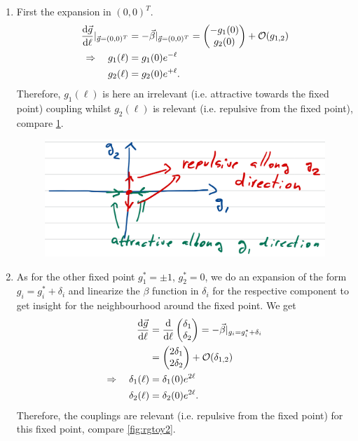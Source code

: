 \begin{enumerate} 
	\item  First the expansion in $(0,0)^T$.
\begin{align}
	\frac{\mathrm{d} \vec{g}}{\mathrm{d} \ell }|_{\vec{g}=(0,0)^T} &= - \vec{\beta}|_{\vec{g}=(0,0)^T} = \begin{pmatrix}
		-g_1(0)\\
		g_2(0) \\
	\end{pmatrix} + \mathcal{O}(g_{1,2}) \nonumber \\
\Rightarrow \quad g_1(\ell) &= g_1(0) e^{-\ell} \\
g_2(\ell) &= g_2(0) e^{+ \ell}.
\end{align}
Therefore, $g_1(\ell)$ is here an irrelevant (i.e. attractive towards the fixed point) coupling whilst $g_2(\ell)$ is relevant (i.e. repulsive from the fixed point), compare \ref{fig:rgtoy1}. 
\begin{figure}[h!]
	\centering
	\includegraphics[width=0.7\linewidth]{gfx/RGtoy1}
	\caption{}
	\label{fig:rgtoy1}
\end{figure}
\item As for the other fixed point $g^*_1=\pm1$, $g^*_2=0$, we do an expansion of the form $g_i=g^*_i+\delta_i$ and linearize the $\beta$ function in $\delta_i$ for the respective component to get insight for the neighbourhood around the fixed point. We get
\begin{align}
	\frac{\mathrm{d} \vec{g}}{\mathrm{d} \ell} &= \frac{\mathrm{d}}{\mathrm{d} \ell} \begin{pmatrix}
		\delta_1 \\
		\delta_2 \\
	\end{pmatrix} = - \vec{\beta }|_{g_i=g^*_i+\delta_i} \nonumber\\
&= \begin{pmatrix}
 2 \delta_1 \\
 2\delta_2 \\
\end{pmatrix} + \mathcal{O}(\delta_{1,2}) \nonumber \\
\Rightarrow \quad \delta_1(\ell) &= \delta_1(0) e^{2 \ell} \\
\delta_2(\ell) &= \delta_2(0) e^{2 \ell}.
\end{align} 
Therefore, the couplings are relevant (i.e. repulsive from the fixed point) for this fixed point, compare \ref{fig:rgtoy2}.


\end{enumerate}
